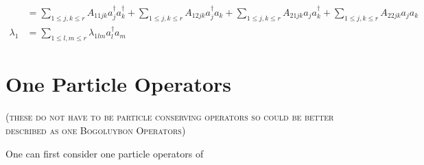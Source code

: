 \documentclass[aps, preprint]{revtex4}
\begin{document}
\begin{align}
 &  =\sum _{1 \leq j ,k \leq r}A_{1 1 j k} a_{j}^{ \dag } a_{k}^{ \dag } +\sum _{1 \leq j ,k \leq r}A_{1 2 j k} a_{j}^{ \dag } a_{k} +\sum _{1 \leq j ,k \leq r}A_{2 1 j k} a_{j} a_{k}^{ \dag } +\sum _{1 \leq j ,k \leq r}A_{2 2 j k} a_{j} a_{k} \\
\lambda _{1} &  =\sum _{1 \leq l ,m \leq r}\lambda _{1 l m} a_{l}^{ \dag } a_{m}\end{align}

\section{One Particle Operators}
\textsc{(these do not have to be particle conserving operators so could be better described as one Bogoluybon Operators)} 

One can first consider one particle operators of 
\end{document}
